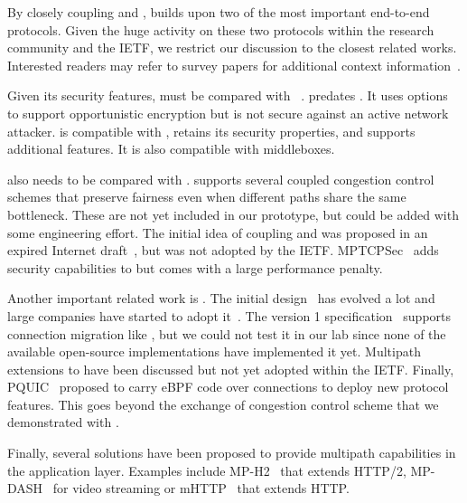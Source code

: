 
By closely coupling \tcp and \tls, \tcpls builds upon two of the most important
end-to-end protocols. Given the huge activity on these two protocols within the
research community and the IETF, we restrict our discussion to the closest
related works. Interested readers may refer to survey papers for additional context information~\cite{polese2019survey,li2016multipath,papastergiou2016ossifying}.

Given its security features, \tcpls must be compared with \tcpcrypt~\cite{bittau2010case,rfc8548}. \tcpcrypt predates . It uses \tcp options to support opportunistic encryption but is not secure against an active network attacker. \tcpls is compatible with \tls, retains its security properties, and supports additional features. It is also compatible with \tcp middleboxes.

\tcpls also needs to be compared with \mptcp \cite{raiciu2012hard,rfc6824}.
\mptcp supports several coupled congestion control schemes
\cite{peng2014multipath,wischik2011design,khalili2013mptcp} that preserve
fairness even when different paths share the same bottleneck. These are not yet
included in our \tcpls prototype, but could be added with some engineering
effort. The initial idea of coupling \mptcp and \tls was proposed in an expired
Internet draft~\cite{draft-paasch-mptcp-ssl-00}, but was not adopted by the
IETF. MPTCPSec~\cite{jadin2017securing} adds security capabilities to \mptcp but
comes with a large performance penalty.

Another important related work is \quic. The initial design~\cite{roskind2013quic} has evolved a lot and large companies have started to adopt it~\cite{langley2017quic,Joras_mvfst,marx2020same}. The \quic
version 1 specification~\cite{draft-ietf-quic-transport} supports connection
migration like \tcpls, but we could not test it in our lab since none of the
available open-source implementations have implemented it yet. Multipath
extensions
\cite{viernickel2018multipath,de2017multipath,draft-liu-multipath-quic-02}
to \quic have been discussed but not yet adopted within the IETF. Finally, PQUIC~\cite{de2019pluginizing} proposed to carry eBPF code over \quic connections to deploy new protocol features. This goes beyond the exchange of congestion control scheme that we demonstrated with \tcpls.

Finally, several solutions have been proposed to provide multipath capabilities
in the application layer. Examples include MP-H2~\cite{nikravesh2019mp} that
extends HTTP/2, MP-DASH~\cite{han2016mp} for video streaming or mHTTP~\cite{kim2014multi} that extends HTTP.

